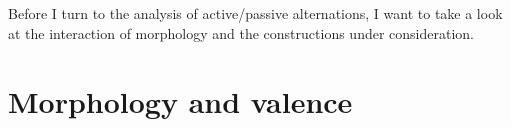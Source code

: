 %


Before I turn to the analysis of active/passive alternations, I want to take a look at the
interaction of morphology and the constructions under consideration.

\chapter{Morphology and valence}%
\label{sec-morphology}
\label{sec-resultative-adjectival-participles}



